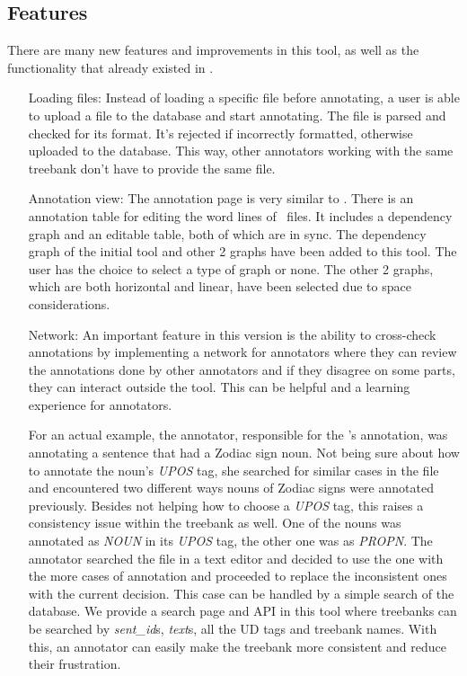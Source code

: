 \subsection{Features}
\label{sec:features}

There are many new features and improvements in this tool, as well as the functionality that already existed in \boatvone.

\begin{itemize}[before=\normalfont, font=\itshape, align=left]
\item[Loading files:] Instead of loading a specific file before annotating, a user is able to upload a \conllu{} file to the database and start annotating.
The file is parsed and checked for its format. It's rejected if incorrectly formatted, otherwise uploaded to the database.
This way, other annotators working with the same treebank don't have to provide the same file.

\item[Annotation view:] The annotation page is very similar to \boatvone.
There is an annotation table for editing the word lines of \conllu\ files.
It includes a dependency graph and an editable table, both of which are in sync.
The dependency graph of the initial tool and other 2 graphs have been added to this tool.
The user has the choice to select a type of graph or none.
The other 2 graphs, which are both horizontal and linear, have been selected due to space considerations.

\item[Network:] An important feature in this version is the ability to cross-check annotations by implementing a network for annotators where they can review the annotations done by other annotators and if they disagree on some parts, they can interact outside the tool.
This can be helpful and a learning experience for annotators.

For an actual example, the annotator, responsible for the \bountreebank{}'s annotation, was annotating a sentence that had a Zodiac sign noun.
Not being sure about how to annotate the noun's \textit{UPOS} tag, she searched for similar cases in the \conllu{} file and encountered two different ways nouns of Zodiac signs were annotated previously.
Besides not helping how to choose a \textit{UPOS} tag, this raises a consistency issue within the treebank as well.
One of the nouns was annotated as \textit{NOUN} in its \textit{UPOS} tag, the other one was as \textit{PROPN}.
The annotator searched the \conllu{} file in a text editor and decided to use the one with the more cases of annotation and proceeded to replace the inconsistent ones with the current decision.
This case can be handled by a simple search of the database.
We provide a search page and API in this tool where treebanks can be searched by \textit{sent\_id}s, \textit{text}s, all the UD tags and treebank names.
With this, an annotator can easily make the treebank more consistent and reduce their frustration.


\end{itemize}
